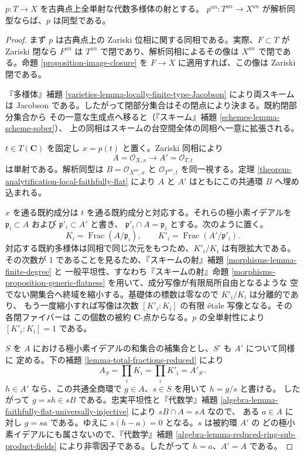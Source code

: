 \begin{proposition}
\label{proposition-analytic-isomorphism-algebraic}
$p:T\to X$ を古典点上全単射な代数多様体の射とする。
$p^{an}:T^{an}\to X^{an}$ が解析同型ならば、$p$ は同型である。
\end{proposition}

\begin{proof}
まず $p$ は古典点上の Zariski 位相に関する同相である。実際、$F\subset T$ が
Zariski 閉なら $F^{an}$ は $T^{an}$ で閉であり、解析同相によるその像は $X^{an}$
で閉である。命題 \ref{proposition-image-closure} を $F\to X$ に適用すれば、この像は
Zariski 閉である。

『多様体』補題 \ref{varieties-lemma-locally-finite-type-Jacobson} により両スキームは
Jacobson である。したがって閉部分集合はその閉点により決まる。既約閉部分集合から
その一意な生成点へ移ると（『スキーム』補題 \ref{schemes-lemma-scheme-sober}）、
上の同相はスキームの台空間全体の同相へ一意に拡張される。

$t\in T(\mathbf C)$ を固定し $x=p(t)$ と置く。Zariski 同相により
$$
A=\mathcal O_{X,x}\longrightarrow A'=\mathcal O_{T,t}
$$
は単射である。解析同型は $B=\mathcal O_{X^{an},x}$ と
$\mathcal O_{T^{an},t}$ を同一視する。定理
\ref{theorem-analytification-local-faithfully-flat} により $A$ と $A'$ はともにこの共通環
$B$ へ埋め込まれる。

$x$ を通る既約成分は $t$ を通る既約成分と対応する。それらの極小素イデアルを
$\mathfrak p_i\subset A$ および $\mathfrak p'_i\subset A'$ と書き、
$\mathfrak p'_i\cap A=\mathfrak p_i$ とする。次のように置く。
$$
K_i=\operatorname{Frac}(A/\mathfrak p_i),
\qquad
K'_i=\operatorname{Frac}(A'/\mathfrak p'_i).
$$
対応する既約多様体は同相で同じ次元をもつため、$K'_i/K_i$ は有限拡大である。その次数が
1 であることを見るため、『スキームの射』補題 \ref{morphisms-lemma-finite-degree} と
一般平坦性、すなわち『スキームの射』命題
\ref{morphisms-proposition-generic-flatness} を用いて、成分写像が有限局所自由となるような
空でない開集合へ終域を縮小する。基礎体の標数は零なので $K'_i/K_i$ は分離的であり、
もう一度縮小すれば写像は次数 $[K'_i:K_i]$ の有限 étale 写像となる。その各閉ファイバーは
この個数の被約 $\mathbf C$-点からなる。$p$ の全単射性により $[K'_i:K_i]=1$ である。

$S$ を $A$ における極小素イデアルの和集合の補集合とし、$S'$ も $A'$ について同様に
定める。下の補題 \ref{lemma-total-fractions-reduced} により
$$
A_S=\prod_iK_i=\prod_iK'_i=A'_{S'}.
$$
$h\in A'$ なら、この共通全商環で $g\in A$、$s\in S$ を用いて $h=g/s$ と書ける。
したがって $g=sh\in sB$ である。忠実平坦性と『代数学』補題
\ref{algebra-lemma-faithfully-flat-universally-injective} により $sB\cap A=sA$ なので、
ある $a\in A$ に対し $g=sa$ である。ゆえに $s(h-a)=0$ となる。$s$ は被約環 $A'$ の
どの極小素イデアルにも属さないので、『代数学』補題
\ref{algebra-lemma-reduced-ring-sub-product-fields} により非零因子である。したがって
$h=a$、$A'=A$ である。


\end{proof}
